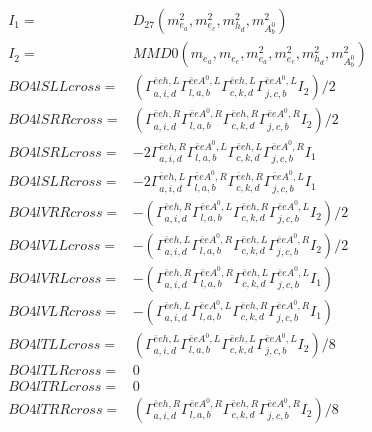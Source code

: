 \documentclass[A4,landscape]{article}
\begin{document}
\begin{align} 
I_1 = & D_{27}(m^2_{e_{{a}}}, m^2_{e_{{c}}}, m^2_{h_{{d}}}, m^2_{A^0_{{b}}}) \\ 
I_2 = & MMD0(m_{e_{{a}}}, m_{e_{{c}}}, m^2_{e_{{a}}}, m^2_{e_{{c}}}, m^2_{h_{{d}}}, m^2_{A^0_{{b}}}) \\ 
  BO4lSLLcross= & ( \Gamma^{\bar{e}e h ,L}_{a, i, d} \Gamma^{\bar{e}e A^0 ,L}_{l, a, b} \Gamma^{\bar{e}e h ,L}_{c, k, d} \Gamma^{\bar{e}e A^0 ,L}_{j, c, b} I_2)/2 \\ 
  BO4lSRRcross= & ( \Gamma^{\bar{e}e h ,R}_{a, i, d} \Gamma^{\bar{e}e A^0 ,R}_{l, a, b} \Gamma^{\bar{e}e h ,R}_{c, k, d} \Gamma^{\bar{e}e A^0 ,R}_{j, c, b} I_2)/2 \\ 
  BO4lSRLcross= & -2  \Gamma^{\bar{e}e h ,R}_{a, i, d} \Gamma^{\bar{e}e A^0 ,L}_{l, a, b} \Gamma^{\bar{e}e h ,L}_{c, k, d} \Gamma^{\bar{e}e A^0 ,R}_{j, c, b} I_1 \\ 
  BO4lSLRcross= & -2  \Gamma^{\bar{e}e h ,L}_{a, i, d} \Gamma^{\bar{e}e A^0 ,R}_{l, a, b} \Gamma^{\bar{e}e h ,R}_{c, k, d} \Gamma^{\bar{e}e A^0 ,L}_{j, c, b} I_1 \\ 
  BO4lVRRcross= & -( \Gamma^{\bar{e}e h ,R}_{a, i, d} \Gamma^{\bar{e}e A^0 ,L}_{l, a, b} \Gamma^{\bar{e}e h ,R}_{c, k, d} \Gamma^{\bar{e}e A^0 ,L}_{j, c, b} I_2)/2 \\ 
  BO4lVLLcross= & -( \Gamma^{\bar{e}e h ,L}_{a, i, d} \Gamma^{\bar{e}e A^0 ,R}_{l, a, b} \Gamma^{\bar{e}e h ,L}_{c, k, d} \Gamma^{\bar{e}e A^0 ,R}_{j, c, b} I_2)/2 \\ 
  BO4lVRLcross= & -( \Gamma^{\bar{e}e h ,R}_{a, i, d} \Gamma^{\bar{e}e A^0 ,R}_{l, a, b} \Gamma^{\bar{e}e h ,L}_{c, k, d} \Gamma^{\bar{e}e A^0 ,L}_{j, c, b} I_1) \\ 
  BO4lVLRcross= & -( \Gamma^{\bar{e}e h ,L}_{a, i, d} \Gamma^{\bar{e}e A^0 ,L}_{l, a, b} \Gamma^{\bar{e}e h ,R}_{c, k, d} \Gamma^{\bar{e}e A^0 ,R}_{j, c, b} I_1) \\ 
  BO4lTLLcross= & ( \Gamma^{\bar{e}e h ,L}_{a, i, d} \Gamma^{\bar{e}e A^0 ,L}_{l, a, b} \Gamma^{\bar{e}e h ,L}_{c, k, d} \Gamma^{\bar{e}e A^0 ,L}_{j, c, b} I_2)/8 \\ 
  BO4lTLRcross= & 0 \\ 
  BO4lTRLcross= & 0 \\ 
  BO4lTRRcross= & ( \Gamma^{\bar{e}e h ,R}_{a, i, d} \Gamma^{\bar{e}e A^0 ,R}_{l, a, b} \Gamma^{\bar{e}e h ,R}_{c, k, d} \Gamma^{\bar{e}e A^0 ,R}_{j, c, b} I_2)/8 \\ 
\end{align} 
\end{document}
